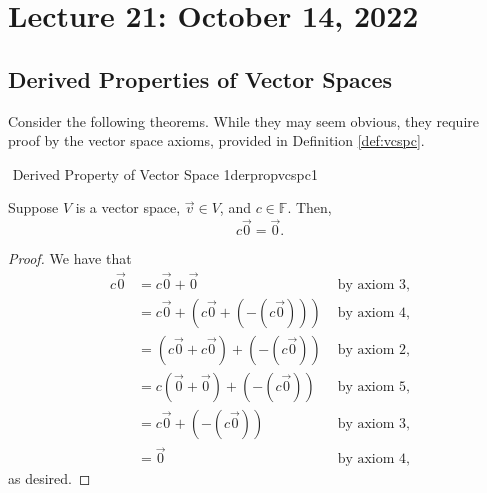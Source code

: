\pagebreak

\section{Lecture 21: October 14, 2022}

    \subsection{Derived Properties of Vector Spaces}

        Consider the following theorems. While they may seem obvious, they require proof by the vector space axioms, provided in Definition \ref{def:vcspc}.
        \begin{theorem}{\Stop\,\,Derived Property of Vector Space 1}{derpropvcspc1}

            Suppose \(V\) is a vector space, \(\vec{v}\in V\), and \(c\in\mathbb{F}\). Then,
            \begin{equation*}
                c\vec{0}=\vec{0}.
            \end{equation*}
            \begin{proof}
                We have that
                \begin{align*}
                    c\vec{0}&=c\vec{0}+\vec{0} &\text{ by axiom \(3\),} \\
                    &=c\vec{0}+(c\vec{0}+(-(c\vec{0}))) &\text{ by axiom \(4\),} \\
                    &=(c\vec{0}+c\vec{0})+(-(c\vec{0})) &\text{ by axiom \(2\),} \\
                    &=c(\vec{0}+\vec{0})+(-(c\vec{0})) &\text{ by axiom \(5\),} \\
                    &=c\vec{0}+(-(c\vec{0})) &\text{ by axiom \(3\),} \\
                    &=\vec{0} &\text{ by axiom \(4\),} 
                \end{align*}
                as desired.
            \end{proof}
        \end{theorem}

